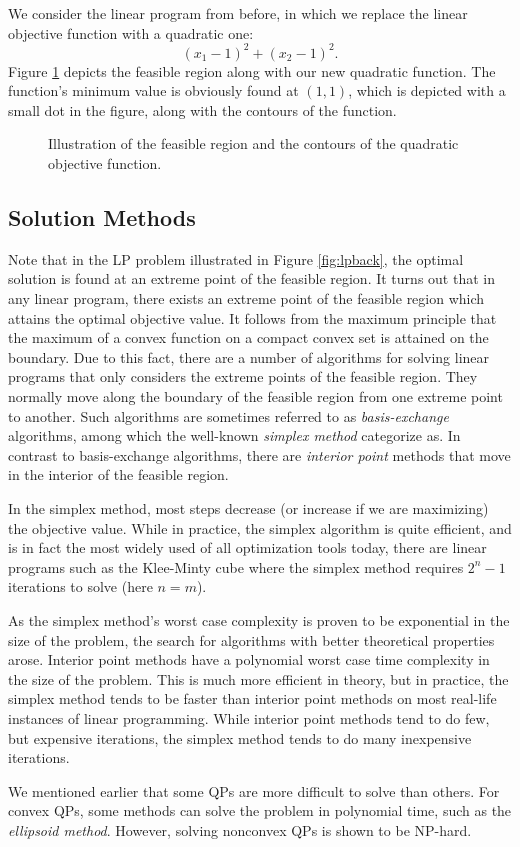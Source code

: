 We consider the linear program from before, in which we replace the linear
objective function with a quadratic one:
\[
(x_1 - 1)^2 + (x_2 - 1)^2.
\]
Figure \ref{fig:qpback} depicts the feasible region along with our new
quadratic function.
The function's minimum value is obviously found at $(1,1)$, which is
depicted with a small dot in the figure, along with the contours of the
function.
\begin{figure}[ht!]
\centering

\caption{Illustration of the feasible region and the contours of the quadratic
         objective function.}
\label{fig:qpback}
\end{figure}

\subsection{Solution Methods}
Note that in the LP problem illustrated in Figure \ref{fig:lpback},
the optimal solution is found at an extreme point
of the feasible region.
It turns out that in any linear program, there exists an extreme point of the
feasible region which attains the optimal objective value.
It follows from the maximum principle that the maximum of a convex function on
a compact convex set is attained on the boundary\cite{rockafellar}.
Due to this fact, there are a number of algorithms for solving linear
programs that only considers the extreme points of the feasible region.
They normally move along the boundary of the feasible region from one extreme
point to another.
Such algorithms are sometimes referred to as \textit{basis-exchange}
algorithms, among which the well-known \textit{simplex method} categorize as.
In contrast to basis-exchange algorithms, there are \textit{interior point}
methods that move in the interior of the feasible region.

In the simplex method, most steps decrease (or increase if we are maximizing)
the objective value.
While in practice, the simplex algorithm is quite efficient, and is in fact
the most widely used of all optimization tools today\cite{nocedal}, there are
linear programs such as the Klee-Minty cube\cite{klee} where the simplex method
requires $2^n - 1$ iterations to solve (here $n = m$).

As the simplex method's worst case complexity is proven to be exponential
in the size of the problem, the search for algorithms with better theoretical
properties arose.
Interior point methods have a polynomial worst case time
complexity in the size of the problem. This is much more efficient in
theory, but in practice, the simplex method tends to be faster than interior
point methods on most real-life instances of linear programming.
While interior point methods tend
to do few, but expensive iterations, the simplex method tends to do
many inexpensive iterations.

We mentioned earlier that some QPs are more difficult to solve than others.
For convex QPs, some methods can solve the problem in polynomial time, such
as the \textit{ellipsoid method}\cite{kozlov}. However, solving nonconvex
QPs is shown to be NP-hard\cite{sahni}.
